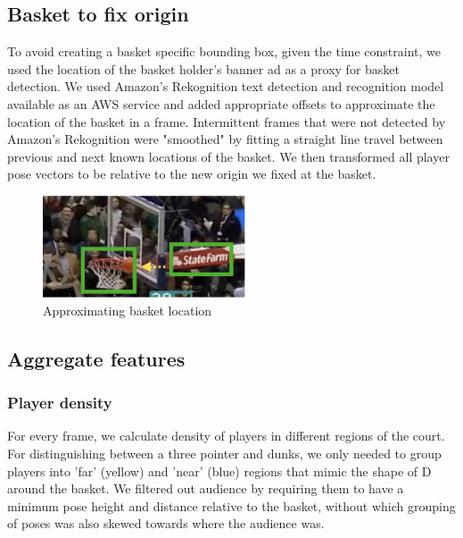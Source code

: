 \documentclass{article}
\begin{document}
\subsection{Basket to fix origin}
\label{basket}

To avoid creating a basket specific bounding box, given the time constraint, we used the location of the basket holder's banner ad as a proxy for basket detection. We used Amazon's Rekognition text detection and recognition model available as an AWS service and added appropriate offsets to approximate the location of the basket in a frame. Intermittent frames that were not detected by Amazon's Rekognition were "smoothed" by fitting a straight line travel between previous and next known locations of the basket. We then transformed all player pose vectors to be relative to the new origin we fixed at the basket.

\begin{figure}[ht]
\vskip -0.05in
\begin{center}
\centerline{\includegraphics[width=6cm]{basket_loc.png}}
\caption{Approximating basket location}
\label{fig:basket_loc}
\end{center}
\vskip -0.2in
\end{figure}

\subsection{Aggregate features}
\label{aggregate_features}

\subsubsection{Player density}
\label{player_density}
For every frame, we calculate density of players in different regions of the court. For distinguishing between a three pointer and dunks, we only needed to group players into 'far' (yellow) and 'near' (blue) regions that mimic the shape of D around the basket. We filtered out audience by requiring them to have a minimum pose height and distance relative to the basket, without which grouping of poses was also skewed towards where the audience was.
\end{document}
